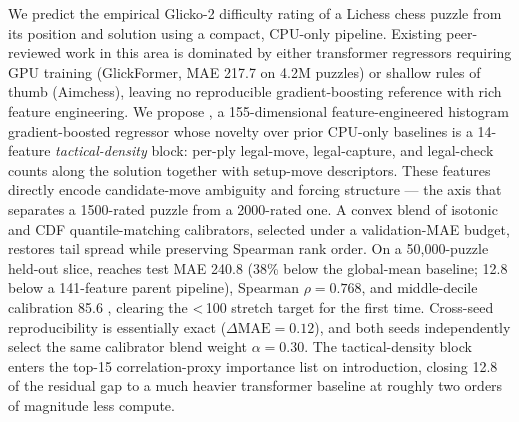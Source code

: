 We predict the empirical Glicko-2 difficulty rating of a Lichess chess puzzle from its position and solution using a compact, CPU-only pipeline. Existing peer-reviewed work in this area is dominated by either transformer regressors requiring GPU training (GlickFormer, MAE 217.7 on 4.2M puzzles) or shallow rules of thumb (Aimchess), leaving no reproducible gradient-boosting reference with rich feature engineering. We propose \ours, a 155-dimensional feature-engineered histogram gradient-boosted regressor whose novelty over prior CPU-only baselines is a 14-feature \emph{tactical-density} block: per-ply legal-move, legal-capture, and legal-check counts along the solution together with setup-move descriptors. These features directly encode candidate-move ambiguity and forcing structure --- the axis that separates a 1500-rated puzzle from a 2000-rated one. A convex blend of isotonic and CDF quantile-matching calibrators, selected under a validation-MAE budget, restores tail spread while preserving Spearman rank order. On a 50{,}000-puzzle held-out slice, \ours reaches test MAE 240.8 \elo (38\% below the global-mean baseline; 12.8 \elo below a 141-feature parent pipeline), Spearman $\rho = 0.768$, and middle-decile calibration 85.6 \elo, clearing the \textless\,100 stretch target for the first time. Cross-seed reproducibility is essentially exact ($\Delta\text{MAE} = 0.12$), and both seeds independently select the same calibrator blend weight $\alpha = 0.30$. The tactical-density block enters the top-15 correlation-proxy importance list on introduction, closing 12.8 \elo of the residual gap to a much heavier transformer baseline at roughly two orders of magnitude less compute.
